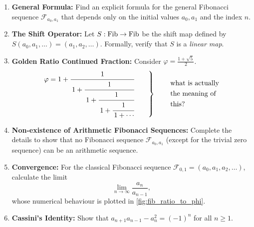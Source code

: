 \begin{exercise}
\label{exc:ch1_list}
\begin{enumerate}
    \item \textbf{General Formula:} Find an explicit formula for the general Fibonacci sequence $\mathcal{F}_{a_0, a_1}$ that depends only on the initial values $a_0, a_1$ and the index $n$.
    \item \textbf{The Shift Operator:} Let $S: \operatorname{Fib} \to \operatorname{Fib}$ be the shift map defined by $S(a_0, a_1, \dots) = (a_1, a_2, \dots)$. Formally, verify that $S$ is a \textit{linear map}.
    \item \textbf{Golden Ratio Continued Fraction:} Consider $\varphi = \frac{1+\sqrt{5}}{2}$.
        \[
        \left.
        \begin{aligned}
        \varphi
        = 1+\cfrac{1}{\,1+\cfrac{1}{\,1+\cfrac{1}{\,1+\cfrac{1}{\,1+\cdots}}}}
        \end{aligned}
        \qquad
        \right\}
        \qquad
        \left.
        \begin{aligned}
        &\text{what is actually}\\
        &\text{the meaning of}\\
        &\text{this?}
        \end{aligned}
        \right.
        \]
    \item \textbf{Non-existence of Arithmetic Fibonacci Sequences:} Complete the details to show that no Fibonacci sequence $\mathcal{F}_{a_0, a_1}$ (except for the trivial zero sequence) can be an arithmetic sequence.
    \item \textbf{Convergence:} For the classical Fibonacci sequence $\mathcal{F}_{0,1} = (a_0, a_1, a_2, \dots)$, calculate the limit
    \[
        \lim_{n \to \infty} \frac{a_n}{a_{n-1}},
    \]
    whose numerical behaviour is plotted in \cref{fig:fib_ratio_to_phi}.
    \item \textbf{Cassini's Identity:} Show that $a_{n+1} a_{n-1} - a_n^2 = (-1)^n$ for all $n \ge 1$. 
\end{enumerate}
\end{exercise}

